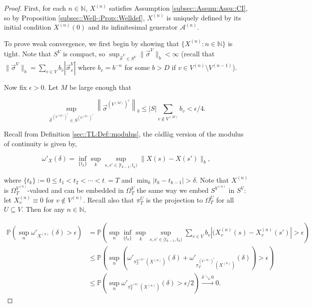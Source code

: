 \documentclass[12pt]{article}
\newcommand{\mb}{\mathbb}
\newcommand{\mc}{\mathcal}
\newcommand{\ra}{\rightarrow}
\newcommand{\os}{\overset}
\newcommand{\ep}{\epsilon}
\newcommand{\ind}{\hspace{24pt}}
\newcommand{\pr}{\mb{P}}							%
\renewcommand{\v}{v}							%
\renewcommand{\U}{U}							%
\renewcommand{\S}{S}							%
\newcommand{\s}{\sigma}							%
\newcommand{\sv}{\vec{\s}}						%
\renewcommand{\b}{b}							%
\newcommand{\T}{T}								%
\renewcommand{\t}{t}							%
\newcommand{\sset}{\Omega}						%
\newcommand{\proj}{\pi}							%
\renewcommand{\tt}{s}							%
\newcommand{\ttt}{s'}							%
\newcommand{\X}{X}								%
\newcommand{\IG}{\mc{A}}						%
\newcommand{\carp}[1]{^{#1}}					%
\newcommand{\vsi}[1]{^{#1}}						%
\newcommand{\cind}[1]{_{#1}}					%
\newcommand{\tp}[1]{(#1)}						%
\newcommand{\ts}[1]{_{#1}}						%
\newcommand{\degr}{D}							%
\newcommand{\sln}[1]{^{(#1)}}					%
\newcommand{\cconst}{M}							%
\newcommand{\cmodu}{\omega'}					%
\newcommand{\pra}[1]{_{#1}}						%
\newcommand{\indx}[1]{_{#1}}					%
\renewcommand{\it}{k}							%
\begin{document}
\begin{proof}
First, for each \(n\in\mb{N}\), \(\X\sln{n}\) satisfies Assumption \ref{subsec::Assum:Assu::CI}, so by Proposition \ref{subsec::Well-:Prop::Welldef}, \(\X\sln{n}\) is uniquely defined by its initial condition \(\X\sln{n}\tp{0}\) and its infinitesimal generator \(\IG\sln{n}\).

\ind To prove weak convergence, we first begin by showing that \(\{\X\sln{n}:n\in \mb{N}\}\) is tight. Note that \(\S\carp{V}\) is compact, so \(\sup_{\sv\vsi{V} \in \S\carp{V}} \|\sv\vsi{V}\|_{\b} < \infty\) (recall that \(\|\sv\vsi{V}\|_{\b} = \sum_{\v \in V} \b\cind{\v} |\sv\cind{\v}\vsi{V}|\) where \(\b\cind{\v} = \b^{-n}\) for some \(\b > \degr\) if \(\v \in V\sln{n}\setminus V\sln{n-1}\)).

\ind Now fix \(\ep > 0\). Let \(\cconst\) be large enough that

\[\sup_{\sv\vsi{\left(V\sln{\cconst}\right)^c} \in \S\carp{\left(V\sln{\cconst}\right)^c}} \left\|\sv\vsi{\left(V\sln{\cconst}\right)^c}\right\|_{\b} \leq |\S|\sum_{\v \notin V\sln{\cconst}} \b\cind{\v} < \ep/4.\]

Recall from Definition \ref{sec::TL:Def::modulus}, the c\`adl\`ag version of the modulus of continuity is given by,

\[\cmodu\pra{\X}(\delta) = \inf_{\{\t\indx{\it}\}} \sup_\it \sup_{\tt,\ttt \in [\t\indx{\it-1},\t\indx{\it})} \|\X\tp{\tt} - \X\tp{\ttt}\|_{\b},\]

where \(\{\t\indx{\it}\} := 0 \leq \t\indx{1} < \t\indx{2} < \cdots < \t\indx{\cdot} = \T\) and \(\min_\it|\t\indx{\it} - \t\indx{\it-1}| > \delta\). Note that \(\X\sln{n}\) is \(\sset\vsi{V\sln{n}}\ts{\T}\)-valued and can be embedded in \(\sset\vsi{V}\ts{\T}\) the same way we embed \(\S\carp{V\sln{n}}\) in \(\S\carp{V}\): let \(\X\sln{n}\cind{\v} \equiv 0\) for \(\v \notin V\sln{n}\). Recall also that \(\proj\vsi{\U}\ts{\T}\) is the projection to \(\sset\vsi{\U}\ts{\T}\) for all \(\U\subseteq V\). Then for any \(n\in \mb{N}\),

\begin{align*}
\pr\left(\sup_n \cmodu\pra{\X\sln{n}}(\delta) > \epsilon\right) &= \pr\left(\sup_n\inf_{\{\t\indx{\it}\}}\sup_\it\sup_{\tt,\ttt \in [\t\indx{\it-1},\t\indx{\it})} \sum_{\v \in V} \b\cind{\v}|(\X\sln{n}\cind{\v}\tp{\tt} - \X\sln{n}\cind{\v}\tp{\ttt}| > \epsilon \right)\\
&\leq \pr\left(\sup_n \left(\cmodu\pra{\proj\vsi{V\sln{\cconst}}\ts{\T}(\X\sln{n})}(\delta) + \cmodu\pra{\proj\vsi{\left(V\sln{\cconst}\right)^c}\ts{\T}(\X\sln{n})}(\delta)\right) > \ep\right)\\
&\leq \pr\left(\sup_n \cmodu\pra{\proj\vsi{V\sln{\cconst}}\ts{\T}(\X\sln{n})}(\delta) > \ep/2\right) \os{\delta\searrow 0}{\ra} 0.
\end{align*}


\end{proof}
\end{document}
